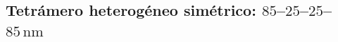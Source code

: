 
\subsection{Tetrámero heterogéneo simétrico: $85$--$25$--$25$--$85\,\text{nm}$}
\label{subsec:tetramero_central}



